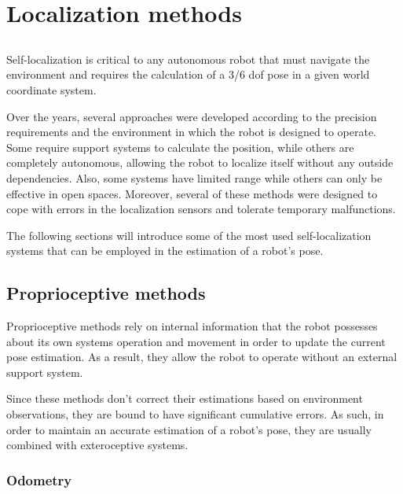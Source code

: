 \chapter{Localization methods}\label{chap:localization-methods}



\section*{}

Self-localization is critical to any autonomous robot that must navigate the environment and requires the calculation of a 3/6 \gls{dof} pose in a given world coordinate system.

Over the years, several approaches were developed according to the precision requirements and the environment in which the robot is designed to operate. Some require support systems to calculate the position, while others are completely autonomous, allowing the robot to localize itself without any outside dependencies. Also, some systems have limited range while others can only be effective in open spaces. Moreover, several of these methods were designed to cope with errors in the localization sensors and tolerate temporary malfunctions.

The following sections will introduce some of the most used self-localization systems that can be employed in the estimation of a robot's pose.



\section{Proprioceptive methods}

Proprioceptive methods rely on internal information that the robot possesses about its own systems operation and movement in order to update the current pose estimation. As a result, they allow the robot to operate without an external support system.

Since these methods don't correct their estimations based on environment observations, they are bound to have significant cumulative errors. As such, in order to maintain an accurate estimation of a robot's pose, they are usually combined with exteroceptive systems.


\subsection{Odometry}

